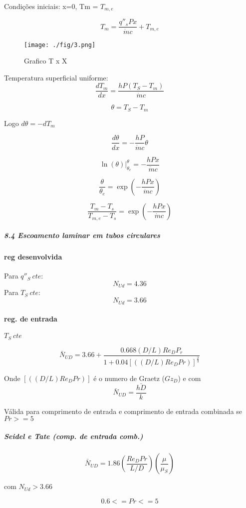 \documentclass[a4paper, 12pt]{article}
\begin{document}
Condições iniciais: x=0, Tm = $T_{m,e}$

\[T_{m}= \frac{q''_{s}Px}{\dot{m}c}+T_{m,e}\]

\begin{figure}[h]
\begin{center}
\texttt{[image: ./fig/3.png]}
\caption{\label{fig:tur}Grafico T x X } 
\end{center}
\end{figure}

Temperatura superficial uniforme:
\[ \frac{dT_{m}}{dx} = \frac{hP(T_{S}-T_{m})}{\dot{m}c}\]

\[\theta=T_{S}-T_{m} \]

Logo $d \theta = -dT_{m}$

\[\frac{d\theta}{dx}=-\frac{hP}{\dot{m}c}\theta\]

\[\ln (\theta)|_{\theta_{e}}^{\theta}= - \frac{hPx}{\dot{m}c}\]

\[\frac{\theta}{\theta_{e}}= \exp (- \frac{hPx}{\dot{m}c})\]

\[\frac{T_{m}-T_{s}}{T_{m,e}-T_{s}}= \exp (- \frac{hPx}{\dot{m}c})\]

\subparagraph*{8.4 Escoamento laminar em tubos circulares}

\paragraph*{reg desenvolvida}

Para $q''_{S}\ cte$: 
\[N_{Ud}=4.36\]
Para $T_{S}\ cte$: 
\[N_{Ud}=3.66\]

\paragraph*{reg. de entrada}

$T_{S}\ cte$

\[\bar{N}_{UD}=3.66+\frac{0.668(D/L)Re_{D}P_{r}}{1+0.04[((D/L)Re_{D}Pr)]^{\frac{2}{3}}}\]

Onde $[((D/L)Re_{D}Pr)]$ é o numero de Graetz ($Gz_{D}$) e com 
\[\bar{N}_{UD}=\frac{\bar{hD}}{k} \]

Válida para comprimento de entrada e comprimento de entrada combinada se $Pr >=5$

\subparagraph*{Seidel e Tate (comp. de entrada comb.)}

\[\bar{N}_{UD}=1.86( \frac{Re_{D}Pr}{L/D} )( \frac{\mu}{\mu_{S}} )\]

com $N_{Ud}>3.66$

\[0.6 <= Pr <= 5\]
\end{document}
